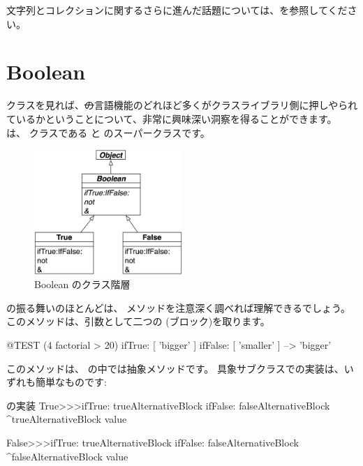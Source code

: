 \documentclass[a4paper,10pt,twoside]{book}
\begin{document}
文字列とコレクションに関するさらに進んだ話題については、を参照してください。


\section{Boolean}

 クラスを見れば、\st の言語機能のどれほど多くがクラスライブラリ側に押しやられているかということについて、非常に興味深い洞察を得ることができます。 は、 クラスである  と  のスーパークラスです。

\begin{figure}[ht]
  {\centerline {\includegraphics[width=0.5\textwidth]{BooleanHierarchy}}}
\caption{Boolean のクラス階層 }
\end{figure}

 の振る舞いのほとんどは、 メソッドを注意深く調べれば理解できるでしょう。このメソッドは、引数として二つの  (ブロック)を取ります。

\begin{code}{@TEST}
(4 factorial > 20) ifTrue: [ 'bigger' ] ifFalse: [ 'smaller' ] --> 'bigger'
\end{code}

このメソッドは、 の中では抽象メソッドです。
具象サブクラスでの実装は、いずれも簡単なものです:

\begin{method}{ の実装}
True>>>ifTrue: trueAlternativeBlock ifFalse: falseAlternativeBlock 
    ^trueAlternativeBlock value

False>>>ifTrue: trueAlternativeBlock ifFalse: falseAlternativeBlock 
    ^falseAlternativeBlock value
\end{method}
\end{document}
